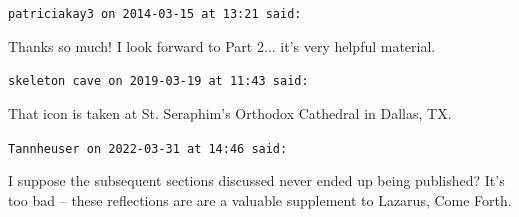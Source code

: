 \begin{footnotesize}
\begin{sffamily}
\hfill

\texttt{patriciakay3 on 2014-03-15 at 13:21 said:}

Thanks so much! I look forward to Part 2... it's very helpful material.

\hfill

\texttt{skeleton cave on 2019-03-19 at 11:43 said:}

That icon is taken at St. Seraphim's Orthodox Cathedral in Dallas, TX.

\hfill

\texttt{Tannheuser on 2022-03-31 at 14:46 said:}

I suppose the subsequent sections discussed never ended up being published? It's too bad -- these reflections are are a valuable supplement to Lazarus, Come Forth.

\end{sffamily}
\end{footnotesize}

